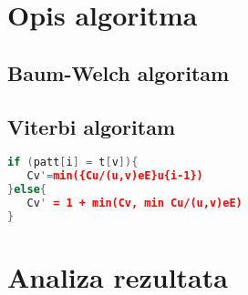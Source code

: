 \documentclass[times, utf8, seminar, numeric]{fer}
\begin{document}
\chapter{Opis algoritma}

\section{Baum-Welch algoritam}


\section{Viterbi algoritam}

 
\begin{lstlisting}[language=C++, caption={Ažuriranje vrijednosti Cv}, captionpos=b, label={k1}]
if (patt[i] = t[v]){
   Cv'=min({Cu/(u,v)eE}u{i-1})
}else{
   Cv' = 1 + min(Cv, min Cu/(u,v)eE)
}
\end{lstlisting}


\chapter{Analiza rezultata}

\nocite{*}


\end{document}
